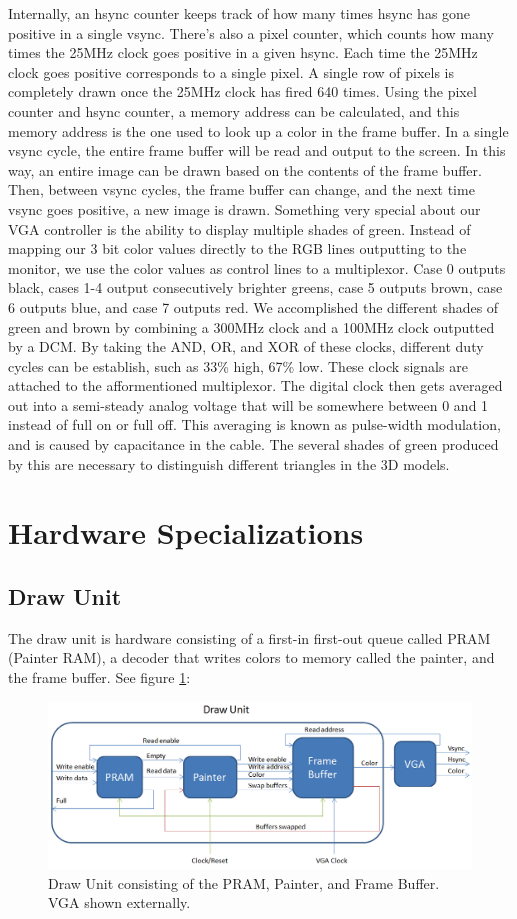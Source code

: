 \documentclass[onecolumn]{IEEEtran}
\begin{document}
Internally, an hsync counter keeps track of how many times hsync has gone positive in a single vsync.  There's also a pixel counter, which counts how many times the 25MHz clock goes positive in a given hsync.  Each time the 25MHz clock goes positive corresponds to a single pixel.  A single row of pixels is completely drawn once the 25MHz clock has fired 640 times.  Using the pixel counter and hsync counter, a memory address can be calculated, and this memory address is the one used to look up a color in the frame buffer.  In a single vsync cycle, the entire frame buffer will be read and output to the screen.  In this way, an entire image can be drawn based on the contents of the frame buffer.  Then, between vsync cycles, the frame buffer can change, and the next time vsync goes positive, a new image is drawn.  Something very special about our VGA controller is the ability to display multiple shades of green.  Instead of mapping our 3 bit color values directly to the RGB lines outputting to the monitor, we use the color values as control lines to a multiplexor.  Case 0 outputs black, cases 1-4 output consecutively brighter greens, case 5 outputs brown, case 6 outputs blue, and case 7 outputs red.  We accomplished the different shades of green and brown by combining a 300MHz clock and a 100MHz clock outputted by a DCM.  By taking the AND, OR, and XOR of these clocks, different duty cycles can be establish, such as 33\% high, 67\% low.  These clock signals are attached to the afformentioned multiplexor.  The digital clock then gets averaged out into a semi-steady analog voltage that will be somewhere between 0 and 1 instead of full on or full off.  This averaging is known as pulse-width modulation, and is caused by capacitance in the cable.  The several shades of green produced by this are necessary to distinguish different triangles in the 3D models.

\section{Hardware Specializations}
\subsection{Draw Unit}
The draw unit is hardware consisting of a first-in first-out queue called PRAM (Painter RAM), a decoder that writes colors to memory called the painter, and the frame buffer.  See figure \ref{fig:draw}:

\begin{figure}[H]
	\centering
	\includegraphics[width=1.0\textwidth]{draw.png}
	\caption{Draw Unit consisting of the PRAM, Painter, and Frame Buffer. VGA shown externally.}
	\label{fig:draw}
\end{figure}
\end{document}
